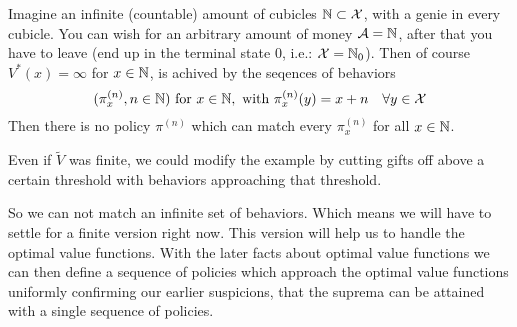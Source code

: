\begin{example} \label{genie cubicles}
Imagine an infinite (countable) amount of cubicles \(\mathbb{N} \subset \mathcal{X}\), with a genie in every cubicle. You can wish for an arbitrary amount of money \(\mathcal{A}=\mathbb{N}\), after that you have to leave (end up in the terminal state \(0\), i.e.: \(\mathcal{X}=\mathbb{N}_0\)). Then of course \(V^*(x)=\infty\) for \(x\in\mathbb{N}\), is achived by the seqences of behaviors 
\[
	(\pi_x^{(n)}, n\in\mathbb{N})\text{ for } x\in\mathbb{N}, \text{ with } \pi_x^{(n)}(y)=x+n\quad \forall y\in\mathcal{X}
\]
Then there is no policy \(\pi^{(n)}\) which can match every \(\pi_x^{(n)}\) for all \(x\in\mathbb{N}\).

Even if \(\tilde{V}\) was finite, we could modify the example by cutting gifts off above a certain threshold with behaviors approaching that threshold. 
\end{example}

So we can not match an infinite set of behaviors. Which means we will have to settle for a finite version right now. This version will help us to handle the optimal value functions. With the later facts about optimal value functions we can then define a sequence of policies which approach the optimal value functions uniformly confirming our earlier suspicions, that the suprema can be attained with a single sequence of policies. 

